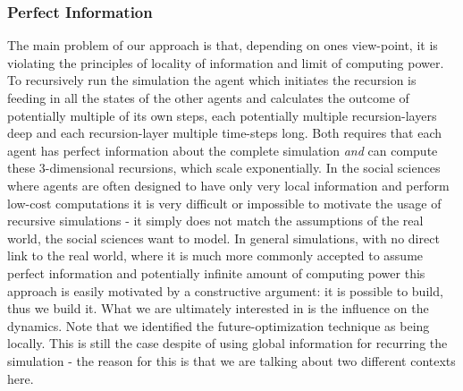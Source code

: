 \subsubsection{Perfect Information}
The main problem of our approach is that, depending on ones view-point, it is violating the principles of locality of information and limit of computing power. To recursively run the simulation the agent which initiates the recursion is feeding in all the states of the other agents and calculates the outcome of potentially multiple of its own steps, each potentially multiple recursion-layers deep and each recursion-layer multiple time-steps long. Both requires that each agent has perfect information about the complete simulation \textit{and} can compute these 3-dimensional recursions, which scale exponentially.
In the social sciences where agents are often designed to have only very local information and perform low-cost computations it is very difficult or impossible to motivate the usage of recursive simulations - it simply does not match the assumptions of the real world, the social sciences want to model.
In general simulations, with no direct link to the real world, where it is much more commonly accepted to assume perfect information and potentially infinite amount of computing power this approach is easily motivated by a constructive argument: it is possible to build, thus we build it.
What we are ultimately interested in is the influence on the dynamics.
Note that we identified the future-optimization technique as being locally. This is still the case despite of using global information for recurring the simulation - the reason for this is that we are talking about two different contexts here.

